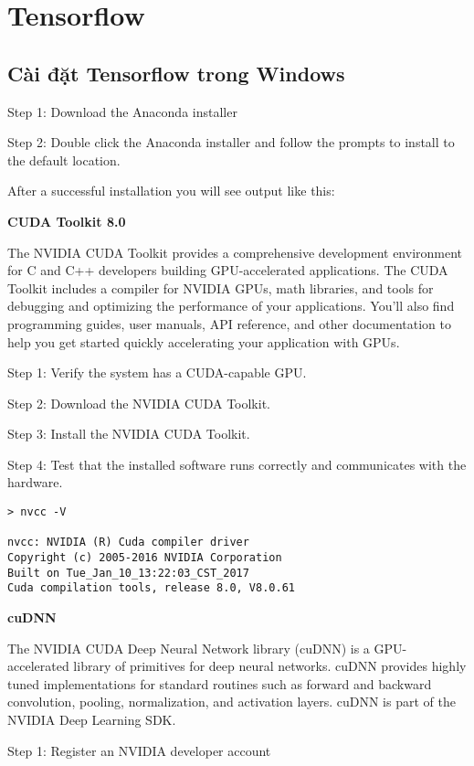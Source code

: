 \chapter{Tensorflow}

\section{Cài đặt Tensorflow trong Windows}

Step 1: Download the Anaconda installer

Step 2: Double click the Anaconda installer and follow the prompts to install to the default location.

After a successful installation you will see output like this:

\textbf{CUDA Toolkit 8.0}

The NVIDIA CUDA Toolkit provides a comprehensive development environment for C and C++ developers building GPU-accelerated applications. The CUDA Toolkit includes a compiler for NVIDIA GPUs, math libraries, and tools for debugging and optimizing the performance of your applications. You’ll also find programming guides, user manuals, API reference, and other documentation to help you get started quickly accelerating your application with GPUs.

Step 1: Verify the system has a CUDA-capable GPU.

Step 2: Download the NVIDIA CUDA Toolkit.

Step 3: Install the NVIDIA CUDA Toolkit.

Step 4: Test that the installed software runs correctly and communicates with the hardware.

\begin{lstlisting}
> nvcc -V

nvcc: NVIDIA (R) Cuda compiler driver
Copyright (c) 2005-2016 NVIDIA Corporation
Built on Tue_Jan_10_13:22:03_CST_2017
Cuda compilation tools, release 8.0, V8.0.61
\end{lstlisting}

\textbf{cuDNN}

The NVIDIA CUDA Deep Neural Network library (cuDNN) is a GPU-accelerated library of primitives for deep neural networks. cuDNN provides highly tuned implementations for standard routines such as forward and backward convolution, pooling, normalization, and activation layers. cuDNN is part of the NVIDIA Deep Learning SDK.

Step 1: Register an NVIDIA developer account

